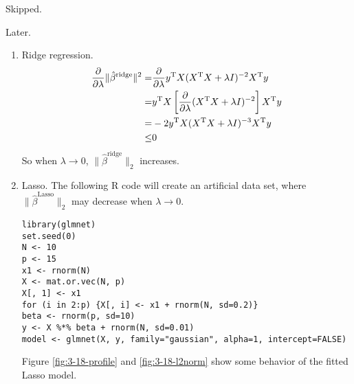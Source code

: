 \begin{sol}
Skipped.
\end{sol}

\begin{sol}
	Later.
\end{sol}

\begin{sol}
\begin{enumerate}
\item Ridge regression.
\begin{align*}
	\frac{\partial}{\partial \lambda}\|\hat{\beta}^{\mathrm{ridge}}\|^2 = & \frac{\partial}{\partial \lambda}y^{\mathrm{T}}X(X^{\mathrm{T}}X+\lambda I)^{-2}X^{\mathrm{T}}y\\
	=& y^{\mathrm{T}}X\left[\frac{\partial}{\partial \lambda} (X^{\mathrm{T}}X+\lambda I)^{-2}\right]X^{\mathrm{T}}y\\
	=& -2y^{\mathrm{T}}X(X^{\mathrm{T}}X+\lambda I)^{-3}X^{\mathrm{T}}y\\
	\le & 0
\end{align*}
So when $\lambda\to 0$, $\|\hat{\beta}^{\mathrm{ridge}}\|_2$ increases.

\item Lasso. The following R code will create an artificial data set, where $\|\hat{\beta}^{\mathrm{Lasso}}\|_2$ may decrease when $\lambda\to 0$.
\begin{verbatim}
library(glmnet)
set.seed(0)
N <- 10
p <- 15
x1 <- rnorm(N)
X <- mat.or.vec(N, p)
X[, 1] <- x1
for (i in 2:p) {X[, i] <- x1 + rnorm(N, sd=0.2)}
beta <- rnorm(p, sd=10)
y <- X %*% beta + rnorm(N, sd=0.01)
model <- glmnet(X, y, family="gaussian", alpha=1, intercept=FALSE)
\end{verbatim}

Figure \ref{fig:3-18-profile} and \ref{fig:3-18-l2norm} show some behavior of the fitted Lasso model.\\


\end{enumerate}
\end{sol}
